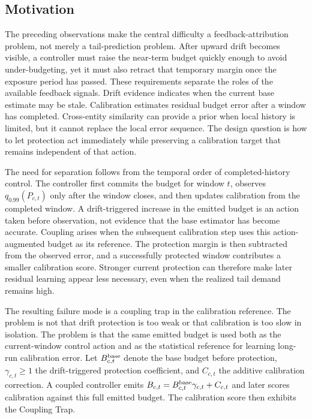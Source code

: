 \documentclass[sigplan,10pt, anonymous]{acmart}
\begin{document}
\subsection{Motivation}
\label{sec:motivation}

The preceding observations make the central difficulty a feedback-attribution problem, not merely a tail-prediction problem. After upward drift becomes visible, a controller must raise the near-term budget quickly enough to avoid under-budgeting, yet it must also retract that temporary margin once the exposure period has passed. These requirements separate the roles of the available feedback signals. Drift evidence indicates when the current base estimate may be stale. Calibration estimates residual budget error after a window has completed. Cross-entity similarity can provide a prior when local history is limited, but it cannot replace the local error sequence. The design question is how to let protection act immediately while preserving a calibration target that remains independent of that action.

The need for separation follows from the temporal order of completed-history control. The controller first commits the budget for window $t$, observes $q_{0.99}(P_{c,t})$ only after the window closes, and then updates calibration from the completed window. A drift-triggered increase in the emitted budget is an action taken before observation, not evidence that the base estimator has become accurate. Coupling arises when the subsequent calibration step uses this action-augmented budget as its reference. The protection margin is then subtracted from the observed error, and a successfully protected window contributes a smaller calibration score. Stronger current protection can therefore make later residual learning appear less necessary, even when the realized tail demand remains high.

The resulting failure mode is a coupling trap in the calibration reference. The problem is not that drift protection is too weak or that calibration is too slow in isolation. The problem is that the same emitted budget is used both as the current-window control action and as the statistical reference for learning long-run calibration error. Let $B_{c,t}^{\rm base}$ denote the base budget before protection, $\gamma_{c,t}\ge1$ the drift-triggered protection coefficient, and $C_{c,t}$ the additive calibration correction. A coupled controller emits $B_{c,t}=B_{c,t}^{\rm base}\gamma_{c,t}+C_{c,t}$ and later scores calibration against this full emitted budget. The calibration score then exhibits the Coupling Trap.
\end{document}
